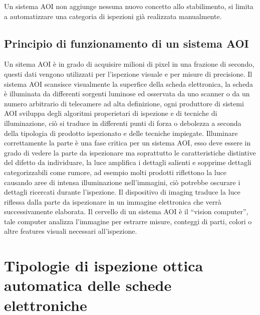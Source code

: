 Un sistema AOI non aggiunge nessuna nuovo concetto allo stabilimento, si limita a automatizzare una
categoria di ispezioni già realizzata manualmente.

\subsection {Principio di funzionamento di un sistema AOI}

Un sitema AOI è in grado di acquisire milioni di pixel in una frazione di secondo, questi dati vengono
utilizzati per l’ispezione visuale e per misure di precisione.
Il sistema AOI scansisce visualmente la superfice della scheda elettronica, la scheda è illuminata da
differenti sorgenti luminose ed osservata da uno scanner o da un numero arbitrario di telecamere ad alta
definizione, ogni produttore di sistemi AOI sviluppa degli algoritmi properietari di ispezione e di tecniche
di illuminazione, ciò si traduce in differenti punti di forza o debolezza a seconda della tipologia di
prodotto ispezionato e delle tecniche impiegate.
Illuminare correttamente la parte è una fase critica per un sistema AOI, esso deve essere in grado di
vedere la parte da ispezionare ma soprattutto le caratteristiche distintive del difetto da individuare, la luce amplifica i dettagli salienti e sopprime dettagli categorizzabili come rumore, ad esempio molti prodotti
riflettono la luce causando aree di intensa illuminazione nell’immagini, ciò potrebbe oscurare i dettagli
ricercati durante l’ispezione.
Il dispositivo di imaging traduce la luce riflessa dalla parte da ispezionare in un immagine elettronica che
verrà successivamente elaborata.
Il cervello di un sistema AOI è il “vision computer”, tale computer analizza l’immagine per estrarre misure,
conteggi di parti, colori o altre features visuali necessari all’ispezione.

\section {Tipologie di ispezione ottica automatica delle schede elettroniche}


